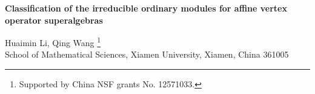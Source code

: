 \documentclass[12pt]{article}
\begin{document}
\begin{center}
{\Large \bf Classification of the irreducible ordinary modules for affine vertex operator superalgebras}
\end{center}


\begin{center}
{Huaimin Li, Qing Wang
		\footnote{Supported by China NSF grants No. 12571033.}\\
School of Mathematical Sciences, Xiamen University, Xiamen, China 361005}	
\end{center}


\begin{abstract}
Let $\mathfrak{g}$ be a basic classical Lie superalgebra,
$\mathcal{k}=\frac{h^{\vee}}{u}-h^{\vee}$ a boundary admissible level of $\widehat{\mathfrak{g}}$,
where $u$ is a positive integer and
$h^{\vee}$ is the dual Coxeter number of $\mathfrak{g}$.
In this paper, we classify the irreducible ordinary modules for the
affine vertex operator superalgebra $L_{\widehat{\mathfrak{g}}}(\mathcal{k},0)$ associated to any basic classical Lie superalgebra $\mathfrak{g}$.
More specifically, if $\mathfrak{g}$ is a basic classical Lie superalgebra of type I,
we prove that $L_{\widehat{\mathfrak{g}}}(\mathcal{k},0)$ has exactly $u$ inequivalent irreducible ordinary modules.
If $\mathfrak{g}$ is a finite dimensional simple Lie algebra or a basic classical Lie superalgebra of type II,
we prove that $L_{\widehat{\mathfrak{g}}}(\mathcal{k},0)$ itself is the only irreducible ordinary $L_{\widehat{\mathfrak{g}}}(\mathcal{k},0)$-module.
\end{abstract}
\end{document}
